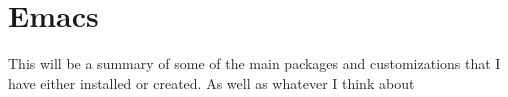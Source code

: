 \chapter{Emacs}

This will be a summary of some of the main packages and customizations that I have either installed or created. As well as whatever I think about
